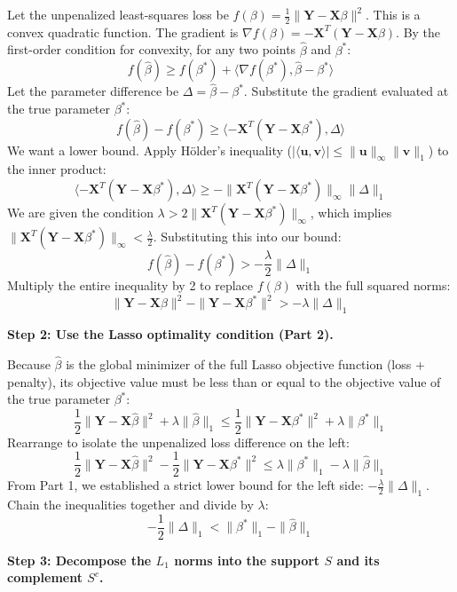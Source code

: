 \begin{solution}
Let the unpenalized least-squares loss be $f(\beta) = \frac{1}{2}\|\mathbf{Y} - \mathbf{X}\beta\|^2$. This is a convex quadratic function.
The gradient is $\nabla f(\beta) = -\mathbf{X}^T(\mathbf{Y} - \mathbf{X}\beta)$.
By the first-order condition for convexity, for any two points $\widehat{\beta}$ and $\beta^*$:
\[ f(\widehat{\beta}) \geq f(\beta^*) + \langle \nabla f(\beta^*), \widehat{\beta} - \beta^* \rangle \]
Let the parameter difference be $\Delta = \widehat{\beta} - \beta^*$. Substitute the gradient evaluated at the true parameter $\beta^*$:
\[ f(\widehat{\beta}) - f(\beta^*) \geq \langle -\mathbf{X}^T(\mathbf{Y} - \mathbf{X}\beta^*), \Delta \rangle \]
We want a lower bound. Apply Hölder's inequality ($|\langle \mathbf{u}, \mathbf{v} \rangle| \leq \|\mathbf{u}\|_\infty \|\mathbf{v}\|_1$) to the inner product:
\[ \langle -\mathbf{X}^T(\mathbf{Y} - \mathbf{X}\beta^*), \Delta \rangle \geq -\|\mathbf{X}^T(\mathbf{Y} - \mathbf{X}\beta^*)\|_\infty \|\Delta\|_1 \]
We are given the condition $\lambda > 2\|\mathbf{X}^T(\mathbf{Y} - \mathbf{X}\beta^*)\|_\infty$, which implies $\|\mathbf{X}^T(\mathbf{Y} - \mathbf{X}\beta^*)\|_\infty < \frac{\lambda}{2}$.
Substituting this into our bound:
\[ f(\widehat{\beta}) - f(\beta^*) > -\frac{\lambda}{2} \|\Delta\|_1 \]
Multiply the entire inequality by 2 to replace $f(\beta)$ with the full squared norms:
\[ \|\mathbf{Y} - \mathbf{X}\widehat{\beta}\|^2 - \|\mathbf{Y} - \mathbf{X}\beta^*\|^2 > -\lambda\|\Delta\|_1 \]

\textbf{Step 2: Use the Lasso optimality condition (Part 2).}

Because $\widehat{\beta}$ is the global minimizer of the full Lasso objective function (loss + penalty), its objective value must be less than or equal to the objective value of the true parameter $\beta^*$:
\[ \frac{1}{2}\|\mathbf{Y} - \mathbf{X}\widehat{\beta}\|^2 + \lambda\|\widehat{\beta}\|_1 \leq \frac{1}{2}\|\mathbf{Y} - \mathbf{X}\beta^*\|^2 + \lambda\|\beta^*\|_1 \]
Rearrange to isolate the unpenalized loss difference on the left:
\[ \frac{1}{2}\|\mathbf{Y} - \mathbf{X}\widehat{\beta}\|^2 - \frac{1}{2}\|\mathbf{Y} - \mathbf{X}\beta^*\|^2 \leq \lambda\|\beta^*\|_1 - \lambda\|\widehat{\beta}\|_1 \]
From Part 1, we established a strict lower bound for the left side: $-\frac{\lambda}{2}\|\Delta\|_1$.
Chain the inequalities together and divide by $\lambda$:
\[ -\frac{1}{2}\|\Delta\|_1 < \|\beta^*\|_1 - \|\widehat{\beta}\|_1 \]

\textbf{Step 3: Decompose the $L_1$ norms into the support $S$ and its complement $S^c$.}


\end{solution}
